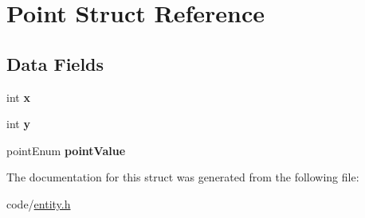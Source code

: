 \hypertarget{structPoint}{}\section{Point Struct Reference}
\label{structPoint}
\subsection*{Data Fields}
\begin{DoxyCompactItemize}
\item 
int {\bfseries x}\hypertarget{structPoint_a8c779e11e694b20e0946105a9f5de842}{}\label{structPoint_a8c779e11e694b20e0946105a9f5de842}

\item 
int {\bfseries y}\hypertarget{structPoint_a2e1b5fb2b2a83571f5c0bc0f66a73cf7}{}\label{structPoint_a2e1b5fb2b2a83571f5c0bc0f66a73cf7}

\item 
point\+Enum {\bfseries point\+Value}\hypertarget{structPoint_a540528736757d82d2eac691b334ac5b5}{}\label{structPoint_a540528736757d82d2eac691b334ac5b5}

\end{DoxyCompactItemize}


The documentation for this struct was generated from the following file\+:\begin{DoxyCompactItemize}
\item 
code/\hyperlink{entity_8h}{entity.\+h}\end{DoxyCompactItemize}
